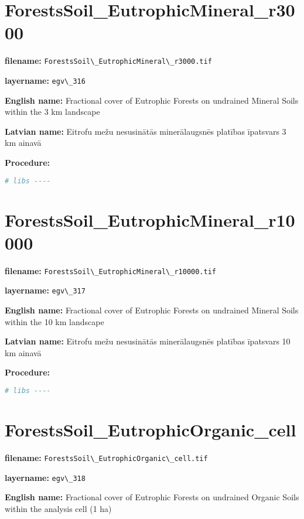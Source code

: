 \documentclass[
]{book}
\newcommand{\passthrough}[1]{#1}
\begin{document}
\section{ForestsSoil\_EutrophicMineral\_r3000}\label{ch06.316}

\textbf{filename:} \passthrough{\lstinline!ForestsSoil\_EutrophicMineral\_r3000.tif!}

\textbf{layername:} \passthrough{\lstinline!egv\_316!}

\textbf{English name:} Fractional cover of Eutrophic Forests on undrained Mineral Soils within the 3 km landscape

\textbf{Latvian name:} Eitrofu mežu nesusinātās minerālaugsnēs platības īpatsvars 3 km ainavā

\textbf{Procedure:}

\begin{lstlisting}[language=R]
# libs ----
\end{lstlisting}

\section{ForestsSoil\_EutrophicMineral\_r10000}\label{ch06.317}

\textbf{filename:} \passthrough{\lstinline!ForestsSoil\_EutrophicMineral\_r10000.tif!}

\textbf{layername:} \passthrough{\lstinline!egv\_317!}

\textbf{English name:} Fractional cover of Eutrophic Forests on undrained Mineral Soils within the 10 km landscape

\textbf{Latvian name:} Eitrofu mežu nesusinātās minerālaugsnēs platības īpatsvars 10 km ainavā

\textbf{Procedure:}

\begin{lstlisting}[language=R]
# libs ----
\end{lstlisting}

\section{ForestsSoil\_EutrophicOrganic\_cell}\label{ch06.318}

\textbf{filename:} \passthrough{\lstinline!ForestsSoil\_EutrophicOrganic\_cell.tif!}

\textbf{layername:} \passthrough{\lstinline!egv\_318!}

\textbf{English name:} Fractional cover of Eutrophic Forests on undrained Organic Soils within the analysis cell (1 ha)
\end{document}
